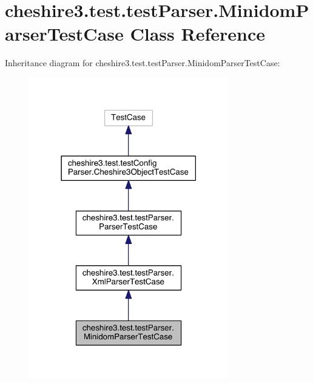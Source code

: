 \hypertarget{classcheshire3_1_1test_1_1test_parser_1_1_minidom_parser_test_case}{\section{cheshire3.\-test.\-test\-Parser.\-Minidom\-Parser\-Test\-Case Class Reference}
\label{classcheshire3_1_1test_1_1test_parser_1_1_minidom_parser_test_case}
}


Inheritance diagram for cheshire3.\-test.\-test\-Parser.\-Minidom\-Parser\-Test\-Case\-:
\nopagebreak
\begin{figure}[H]
\begin{center}
\leavevmode
\includegraphics[width=246pt]{classcheshire3_1_1test_1_1test_parser_1_1_minidom_parser_test_case__inherit__graph}
\end{center}
\end{figure}


